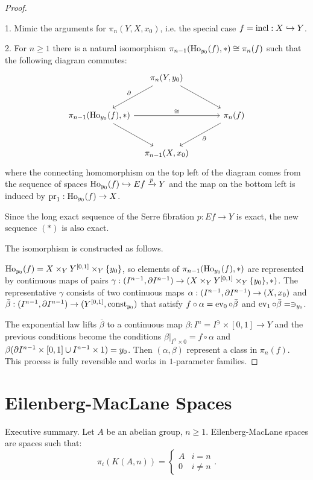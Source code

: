 \begin{proof}\ 

1. Mimic the arguments for $\pi_n(Y,X,x_0)$, i.e. the special case $f=\operatorname{incl}:X\hookrightarrow Y$.

2. For $n\geq1$ there is a natural isomorphism $\pi_{n-1}(\operatorname{Ho}_{y_0}(f),*)\cong\pi_n(f)$ such that the following diagram commutes:
\[
\begin{tikzcd}[column sep={8em,between origins},row sep=large]
& \pi_n(Y,y_0) \arrow[dl,"\de"'] \arrow[dr] & \\
\pi_\ni(\ho_{y_0}(f),*) \arrow[dr] \arrow[rr,"\cong"] && \pi_n(f) \arrow[dl,"\de"] \\
 & \pi_\ni(X,x_0) &
\end{tikzcd}
\]
where the connecting homomorphism on the top left of the diagram comes from the sequence of spaces $\operatorname{Ho}_{y_0}(f)\hookrightarrow Ef\xrightarrow{p} Y$ and the map on the bottom left is induced by $\operatorname{pr}_1:\operatorname{Ho}_{y_0}(f)\to X$.

Since the long exact sequence of the Serre fibration $p:Ef\to Y$ is exact, the new sequence $(*)$ is also exact.

The isomorphism is constructed as follows.

$\operatorname{Ho}_{y_0}(f)=X\times_Y Y^{[0,1]}\times_Y\{y_0\}$, so elements of $\pi_{n-1}(\operatorname{Ho}_{y_0}(f),*)$ are represented by continuous maps of pairs $\gamma:(I^{n-1},\partial I^{n-1})\to (X\times_Y Y^{[0,1]}\times_Y\{y_0\},*)$. The representative $\gamma$ consists of two continuous maps $\alpha:(I^{n-1},\partial I^{n-1})\to(X,x_0)$ and $\bar\beta:(I^{n-1},\partial I^{n-1})\to(Y^{[0,1]},\operatorname{const}_{y_0})$ that satisfy $f\circ\alpha=\operatorname{ev}_0\circ\bar\beta$ and $\ev_1\circ\bar\beta=\cont_{y_0}$.

The exponential law lifts $\bar\beta$ to a continuous map $\beta:I^n=I^\ni\times[0,1]\to Y$ and the previous conditions become the conditions $\beta|_{I^\ni\times0}=f\circ\alpha$ and $\beta(\partial I^{n-1}\times[0,1]\cup I^{n-1}\times1)=y_0$. Then $(\alpha,\beta)$ represent a class in $\pi_n(f)$. This process is fully reversible and works in $1$-parameter families.

\end{proof}

\chapter{Eilenberg-MacLane Spaces}

Executive summary. Let $A$ be an abelian group, $n\geq1$.
Eilenberg-MacLane spaces are spaces such that:
\[\pi_i(K(A,n))=\begin{cases}
A & i=n\\
0 & i\neq n
\end{cases}.\]

